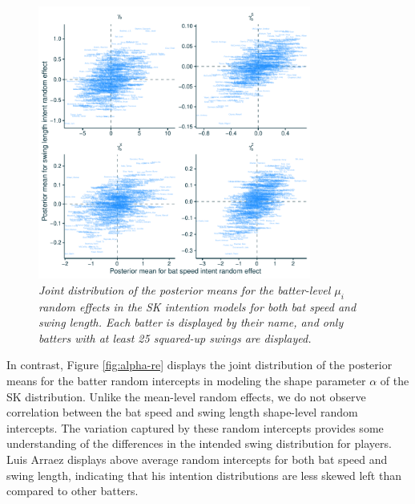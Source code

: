 \documentclass{article}
\begin{document}
      \begin{figure}[H]
        \centering
        \includegraphics[width = 0.8\textwidth]{../../figures/intent_re.pdf}
        \caption{\it Joint distribution of the posterior means for the batter-level $\mu_i$ random effects in the SK intention models for both bat speed and swing length. Each batter is displayed by their name, and only batters with at least 25 squared-up swings are displayed.}
        \label{fig:intent-re}
      \end{figure}
        
       In contrast, Figure \ref{fig:alpha-re} displays the joint distribution of the posterior means for the batter random intercepts in modeling the shape parameter $\alpha$ of the SK distribution. Unlike the mean-level random effects, we do not observe correlation between the bat speed and swing length shape-level random intercepts. The variation captured by these random intercepts provides some understanding of the differences in the intended swing distribution for players. Luis Arraez displays above average random intercepts for both bat speed and swing length, indicating that his intention distributions are less skewed left than compared to other batters. 
                
\end{document}
